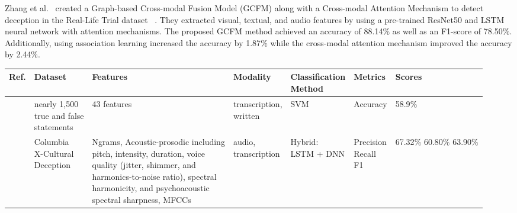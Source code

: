 \documentclass[12pt]{article}
\begin{document}
Zhang et al.~\cite{zhang2022fine} created a Graph-based Cross-modal Fusion Model (GCFM) along with a Cross-modal Attention Mechanism to detect deception in the Real-Life Trial dataset ~\cite{csen2020multimodal}. They extracted visual, textual, and audio features by using a pre-trained ResNet50 and LSTM neural network with attention mechanisms. The proposed GCFM method achieved an accuracy of 88.14$\%$ as well as an F1-score of 78.50$\%$. Additionally, using association learning increased the accuracy by 1.87$\%$ while the cross-modal attention mechanism improved the accuracy by 2.44$\%$.
\begin{singlespace}
\begin{adjustwidth}{-2.5 cm}{-2 cm}\centering
\begin{threeparttable}[H]
\scriptsize
\begin{tabular}{l l l l l l l }
\hline
{\bf Ref.} &
{\bf Dataset} &
{\bf Features} &
{\bf Modality} &
\makecell{\bf Classification\\ \bf Method}&
{\bf Metrics} &
{\bf Scores} \\ \hline
  
\cite{sarzynska2023truth}
& \makecell{ nearly 1,500 \\ true and false \\ statements}
& 43 features
& \makecell{transcription,\\ written}
& SVM
& Accuracy
& 58.9$\%$\\ \hline

\cite{mendels2017hybrid}
& \makecell{Columbia \\ X-Cultural \\ Deception}
& \makecell{ 
Ngrams, Acoustic-prosodic including\\ pitch, intensity, duration, voice\\ quality (jitter, shimmer, and\\ harmonics-to-noise ratio), spectral\\ harmonicity, and psychoacoustic \\spectral sharpness, MFCCs}
& \makecell{audio,\\ transcription}
& \makecell{Hybrid:\\ LSTM + DNN}
& \makecell{Precision\\ Recall \\ F1} 
& \makecell{67.32$\%$ \\ 60.80$\%$ \\ 63.90$\%$}    \\ \hline


\end{tabular}
\end{threeparttable}
\end{adjustwidth}
\end{singlespace}
\end{document}
